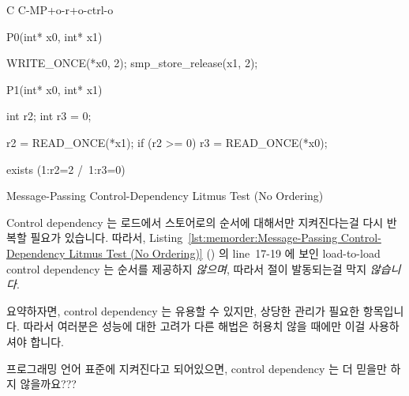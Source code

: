 \begin{listing}[tbp]
{ \scriptsize
\begin{verbbox}[\LstLineNo]
C C-MP+o-r+o-ctrl-o

{
}

P0(int* x0, int* x1) {

  WRITE_ONCE(*x0, 2);
  smp_store_release(x1, 2);

}

P1(int* x0, int* x1) {
  int r2;
  int r3 = 0;

  r2 = READ_ONCE(*x1);
  if (r2 >= 0)
    r3 = READ_ONCE(*x0);

}

exists (1:r2=2 /\ 1:r3=0)
\end{verbbox}
}
\centering
\theverbbox
\caption{Message-Passing Control-Dependency Litmus Test (No Ordering)}
\label{lst:memorder:Message-Passing Control-Dependency Litmus Test (No Ordering)}
\end{listing}

Control dependency 는 로드에서 스토어로의 순서에 대해서만 지켜진다는걸 다시
반복할 필요가 있습니다.
따라서,
Listing~\ref{lst:memorder:Message-Passing Control-Dependency Litmus Test (No Ordering)}
()
의 line~17-19 에 보인 load-to-load control dependency 는 순서를 제공하지
\emph{않으며}, 따라서  절이 발동되는걸 막지 \emph{않습니다}.

요약하자면, control dependency 는 유용할 수 있지만, 상당한 관리가 필요한
항목입니다.
따라서 여러분은 성능에 대한 고려가 다른 해법은 허용치 않을 때에만 이걸
사용하셔야 합니다.

\QuickQuiz{}
	프로그래밍 언어 표준에 지켜진다고 되어있으면, control dependency 는 더
	믿을만 하지 않을까요???

\QuickQuizAnswer{
	시간이 흐르면, 어쩌면 그렇게 표준이 만들어질 수 있을 겁니다.

} \QuickQuizEnd

